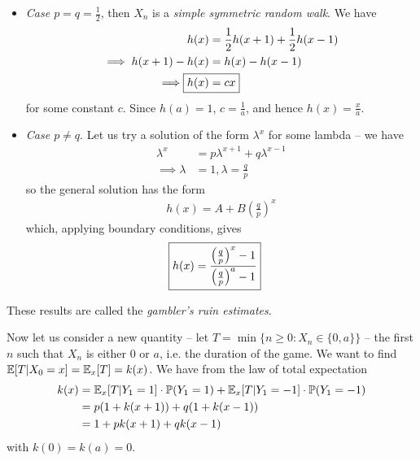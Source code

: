 \documentclass{../template/note}
\begin{document}
    \begin{itemize}
        \item \emph{Case \(p=q=\frac 1 2\)}, then \(X_n\) is a \emph{simple symmetric random walk}. We have
        \begin{align*}
            h(x) &= \frac 1 2 h(x+1) + \frac 1 2 h(x-1) \\
            \implies h(x+1) - h(x) &= h(x) - h(x-1) \\
            \implies \Aboxed{h(x) &= cx}
        \end{align*}
        for some constant \(c\). Since \(h(a) = 1\), \(c = \frac 1 a\), and hence \(h(x) = \frac x a\).
        \item \emph{Case \(p\neq q\)}. Let us try a solution of the form \(\lambda^x\) for some lambda -- we have
        \begin{align*}
            \lambda^x &= p\lambda^{x+1} + q\lambda^{x-1} \\
            \implies \lambda &= 1, \lambda = \frac q p
        \end{align*}
        so the general solution has the form
        \begin{align*}
            h(x) = A + B\left(\frac q p\right)^x
        \end{align*}
        which, applying boundary conditions, gives
        \begin{align*}
            \Aboxed{h(x) = \frac{\left(\frac q p\right)^x - 1}{\left(\frac q p\right)^a-1}}
        \end{align*}
    \end{itemize}
    
    These results are called the \emph{gambler's ruin estimates}.

    Now let us consider a new quantity -- let \(T = \min\{n \geq 0: X_n \in \{0, a\}\}\) -- the first \(n\) such that \(X_n\) is either 0 or \(a\), i.e. the duration of the game. We want to find \(\mathbb E[T | X_0 = x] = \mathbb E_x[T] = k(x)\). We have from the law of total expectation
    \begin{align*}
        k(x) &= \mathbb E_x[T | Y_1 = 1]\cdot\mathbb P(Y_1 = 1) + \mathbb E_x[T | Y_1 = -1]\cdot\mathbb P(Y_1 = -1) \\
        &= p(1 + k(x+1)) + q(1 + k(x-1)) \\
        &= 1 + pk(x+1) + qk(x-1)
    \end{align*}
    with \(k(0) = k(a) = 0\).
\end{document}
